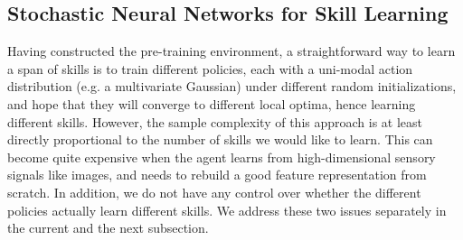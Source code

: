 \documentclass{article} %
\begin{document}


\subsection{Stochastic Neural Networks for Skill Learning}
\label{section:method:snn}

Having constructed the pre-training environment, a straightforward way to learn a span of skills is to train different policies, each with a uni-modal action distribution (e.g. a multivariate Gaussian) under different random initializations, and hope that they will converge to different local optima, hence learning different skills. However, the sample complexity of this approach is at least directly proportional to the number of skills we would like to learn. This can become quite expensive when the agent learns from high-dimensional sensory signals like images, and needs to rebuild a good feature representation from scratch. In addition, we do not have any control over whether the different policies actually learn different skills. We address these two issues separately in the current and the next subsection.%
\end{document}
